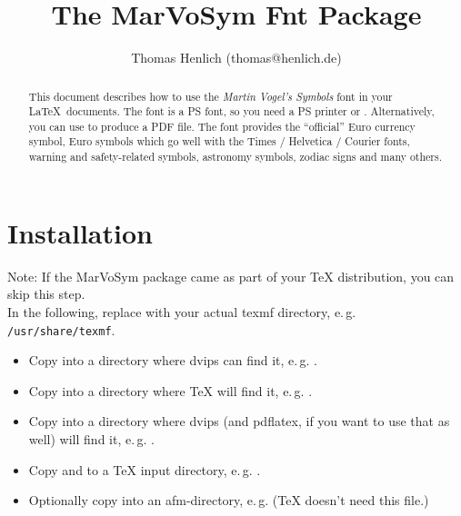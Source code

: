 \documentclass[12pt,a4paper,normalheadings]{scrartcl}
\begin{document}
\renewcommand\arraystretch{1.4}
\newcommand\leg[1]{{\tiny\tt\char92#1}}
\newcommand\sho[1]{{\large #1}}
\newcommand\email{\begingroup \urlstyle{tt}\Url}
\title{The MarVoSym F{\LARGE\Football}nt Package}
\author{Thomas Henlich (thomas@henlich.de)}
\maketitle
\begin{abstract}
  This document describes how to use the \emph{Martin Vogel's Symbols} font
  in your \LaTeX\ documents. The font is a PS font, so you need a PS printer
  or . Alternatively, you can use  to
  produce a PDF file. The font provides the ``official'' Euro currency
  symbol, Euro symbols which go well with the Times / Helvetica / Courier
  fonts, warning and safety-related symbols, astronomy symbols, zodiac signs
  and many others.
\end{abstract}

\section{Installation}
Note: If the MarVoSym package came as part of your \TeX{} distribution, you can skip this step.\\
In the following, replace  with your actual texmf directory, e.\,g.
\texttt{/usr/share/texmf}.

\begin{itemize}
\item Copy  into a directory where dvips can find it, e.\,g.
  .
\item Copy  into a directory where \TeX{} will find it, e.\,g.
  .
\item Copy  into a directory where dvips (and pdflatex, if you want to use that as well) will find it,
  e.\,g. .
\item Copy  and  to a \TeX{} input directory, e.\,g.
.
\item Optionally copy  into an afm-directory,  e.\,g.
   (\TeX{} doesn't need this file.)
\end{itemize}
\end{document}
